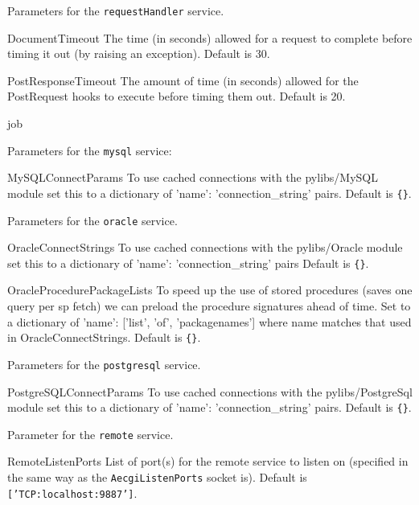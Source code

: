 \documentclass[titlepage]{manual}
\begin{document}
Parameters for the \texttt{requestHandler} service.
\begin{argdesc}
\item[DocumentTimeout]
The time (in seconds) allowed for a request to complete before timing
it out (by raising an exception).
Default is 30.
\item[PostResponseTimeout]
The amount of time (in seconds) allowed for the PostRequest hooks to
execute before timing them out.
Default is 20.
\item[job] 
\end{argdesc}



Parameters for the \texttt{mysql} service:
\begin{argdesc}
\item[MySQLConnectParams] \nonscope
To use cached connections with the pylibs/MySQL module set this to
a dictionary of 'name': 'connection\_string' pairs.
Default is \texttt{\{\}}.
\end{argdesc}


Parameters for the \texttt{oracle} service.
\begin{argdesc}
\item[OracleConnectStrings]  \nonscope
To use cached connections with the pylibs/Oracle module set this to
a dictionary of 'name': 'connection\_string' pairs
Default is \texttt{\{\}}.
\item[OracleProcedurePackageLists] \nonscope
To speed up the use of stored procedures (saves one query per sp fetch)
we can preload the procedure signatures ahead of time.
Set to a dictionary of 'name': ['list', 'of', 'packagenames'] where name
matches that used in OracleConnectStrings.
Default is \texttt{\{\}}.
\end{argdesc}

Parameters for the \texttt{postgresql} service.
\begin{argdesc}
\item[PostgreSQLConnectParams] \nonscope
To use cached connections with the pylibs/PostgreSql module set this to
a dictionary of 'name': 'connection\_string' pairs.
Default is \texttt{\{\}}.
\end{argdesc}



Parameter for the \texttt{remote} service.
\begin{argdesc}
\item[RemoteListenPorts] \nonscope
List of port(s) for the remote service to listen on (specified in the same
way as the \texttt{AecgiListenPorts} socket is).  
Default is \texttt{['TCP:localhost:9887']}.
\end{argdesc}
\end{document}
